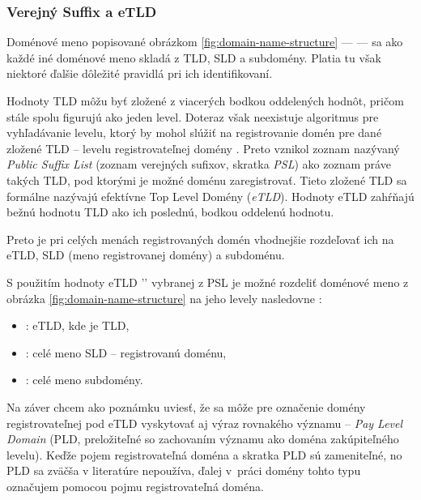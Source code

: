 \pagebreak

\subsubsection{Verejný Suffix a eTLD}
\label{public-suffix-and-etld}

Doménové meno popisované obrázkom \ref{fig:domain-name-structure} ---  --- sa ako každé iné doménové meno skladá z TLD, SLD a subdomény. 
Platia tu však niektoré ďalšie dôležité pravidlá pri ich identifikovaní.

Hodnoty TLD môžu byť zložené z viacerých bodkou oddelených hodnôt, pričom stále spolu figurujú ako jeden level.
Doteraz však neexistuje algoritmus pre vyhľadávanie levelu, ktorý by mohol slúžiť na registrovanie domén pre dané zložené TLD -- levelu registrovateľnej domény \cite{mozilla-psl-learn}.
Preto vznikol zoznam nazývaný \emph{Public Suffix List} (zoznam verejných sufixov, skratka \emph{PSL}) ako zoznam práve takých TLD, pod ktorými je možné doménu zaregistrovať.
Tieto zložené TLD sa formálne nazývajú efektívne Top Level Domény (\emph{eTLD}).
Hodnoty eTLD zahŕňajú bežnú hodnotu TLD ako ich poslednú, bodkou oddelenú hodnotu.

\noindent Preto je pri celých menách registrovaných domén vhodnejšie rozdeľovať ich na eTLD, SLD (meno registrovanej domény) a subdoménu.

S použitím hodnoty eTLD '' vybranej z PSL je možné rozdeliť doménové meno z obrázka \ref{fig:domain-name-structure} na jeho levely nasledovne \cite{michal-spacek-etld-article}: 
\begin{itemize}
    \item {}: eTLD, kde  je TLD,
    \item {}: celé meno SLD -- registrovanú doménu,
    \item {}: celé meno subdomény.
\end{itemize}

Na záver chcem ako poznámku uviesť, že sa môže pre označenie domény registrovateľnej pod eTLD vyskytovať aj výraz rovnakého významu 
-- \textit{Pay Level Domain} (PLD, preložiteľné so zachovaním významu ako doména zakúpiteľného levelu).
Keďže pojem registrovateľná doména a skratka PLD sú zameniteľné, no PLD sa zväčša v literatúre nepoužíva, 
ďalej \mbox{v práci} domény tohto typu označujem pomocou pojmu registrovateľná doména.



